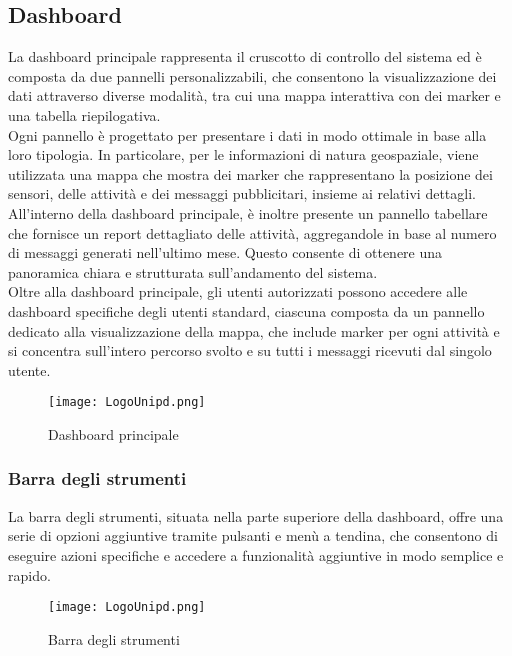 \documentclass[10pt]{article}
\begin{document}
\begin{justify}
\subsection{Dashboard}
La dashboard principale rappresenta il cruscotto di controllo del sistema ed è composta da due pannelli personalizzabili, che consentono la visualizzazione dei dati attraverso diverse modalità, tra cui una mappa interattiva con dei marker e una tabella riepilogativa.\\
Ogni pannello è progettato per presentare i dati in modo ottimale in base alla loro tipologia. In particolare, per le informazioni di natura geospaziale, viene utilizzata una mappa che mostra dei marker che rappresentano la posizione dei sensori, delle attività e dei messaggi pubblicitari, insieme ai relativi dettagli. All'interno della dashboard principale, è inoltre presente un pannello tabellare che fornisce un report dettagliato delle attività, aggregandole in base al numero di messaggi generati nell'ultimo mese. Questo consente di ottenere una panoramica chiara e strutturata sull'andamento del sistema.\\
Oltre alla dashboard principale, gli utenti autorizzati possono accedere alle dashboard specifiche degli utenti standard, ciascuna composta da un pannello dedicato alla visualizzazione della mappa, che include marker per ogni attività e si concentra sull'intero percorso svolto e su tutti i messaggi ricevuti dal singolo utente.\\
\begin{figure}[H]
    \centering
    \texttt{[image: LogoUnipd.png]}
    \caption{Dashboard principale}
\end{figure}

    \subsubsection{Barra degli strumenti} %
    La barra degli strumenti, situata nella parte superiore della dashboard, offre una serie di opzioni aggiuntive tramite pulsanti e menù a tendina, che consentono di eseguire azioni specifiche e accedere a funzionalità aggiuntive in modo semplice e rapido.\\
    \begin{figure}[H]
    \centering
    \texttt{[image: LogoUnipd.png]}
    \caption{Barra degli strumenti}
    \end{figure}


\end{justify}
\end{document}
